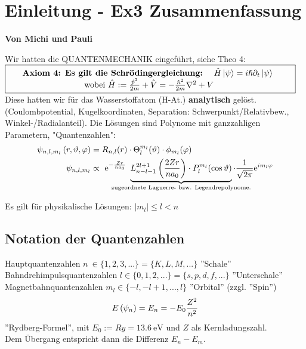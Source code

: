 \documentclass[Ex4_Zusammenfassung.tex]{subfiles}
\begin{document}
	
\chapter{Einleitung - Ex3 Zusammenfassung}
\textbf{Von Michi und Pauli} \newline

Wir hatten die QUANTENMECHANIK eingeführt, siehe Theo 4:\\

$ \fbox{\parbox{\dimexpr\linewidth-2\fboxsep-2\fboxrule\relax}
	{\centering 
		\textbf{Axiom 4:  Es gilt die  Schrödingergleichung: \ } 
		$  \hat{H} \ket{\psi} = i \hslash \partial_t \ket{\psi}\ $ \\
		wobei $ \hat{H} := \frac{\hat{p}^2}{2m} + \hat{V} = - \frac{\hslash^2}{2m} \nabla^2 + V$
		 } } $ \\

Diese hatten wir für das Wasserstoffatom (H-At.) \textbf{analytisch} gelöst. (Coulombpotential, Kugelkoordinaten, Separation: Schwerpunkt/Relativbew., Winkel-/Radialanteil). Die Lösungen sind Polynome mit ganzzahligen Parametern, "Quantenzahlen":
\begin{align*}
	\psi_{n,l,m_l}\lp r, \vartheta, \varphi \rp &= R_{n,l} (r) \cdot \Theta_l^{m_l} (\vartheta) \cdot \phi_{m_l} (\varphi)\\
	\psi_{n,l,m_l} &\propto\  \mathrm{e}^{- \frac{Zr}{na_0}}\  \underbrace{L_{n-l-1}^{2l+1} \lp \frac{2Zr}{na_0} \rp \cdot P_l^{m_l} (\cos{\vartheta})}_{\mathclap{\text{zugeordnete Laguerre- bzw. Legendrepolynome.}}} \cdot \frac{1}{\sqrt{2\pi}} \mathrm{e}^{im_l \varphi}\\
\end{align*}

Es gilt für physikalische Lösungen: $\boxed{ | m_l | \leq l < n } $\\ 

\section{Notation der Quantenzahlen}
Hauptquantenzahlen $n\ \in \{ 1, 2, 3, ... \} = \{K, L, M, ...\}$ ''Schale'' \\
Bahndrehimpulsquantenzahlen $ l \in \{0, 1, 2, ...\} = \{s, p, d, f, ...\} $ ''Unterschale'' \\
Magnetbahnquantenzahlen $m_l \in \{-l, -l+1, ... , l \}$ ''Orbital'' (zzgl. ''Spin'')\\
\begin{equation*}
	E \left( \psi_n \right) = E_n = -E_0 \frac{Z^2}{n^2}
\end{equation*}
''Rydberg-Formel'', mit $E_0 := Ry =\SI{13.6}{\eV} $ und $Z$ als Kernladungszahl.\\
Dem Übergang entspricht dann die Differenz $E_n - E_m$.
\end{document}
